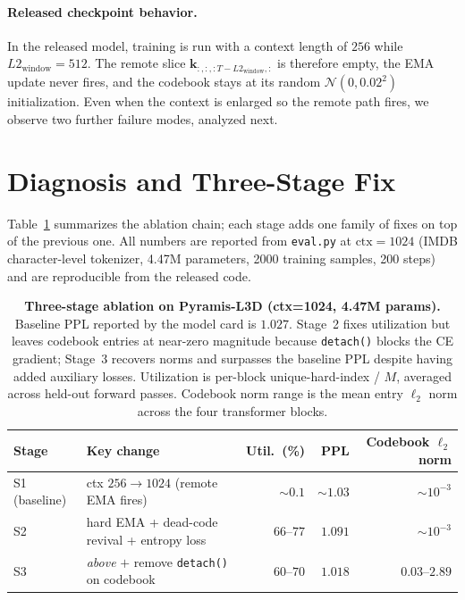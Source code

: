\documentclass[11pt,a4paper]{article}
\begin{document}
\paragraph{Released checkpoint behavior.} In the released model, training is run with a
context length of $256$ while $L2_{\text{window}}=512$. The remote slice
$\bm{k}_{:,:,:T-L2_{\text{window}},:}$ is therefore empty, the EMA update never fires, and
the codebook stays at its random $\mathcal{N}(0, 0.02^2)$ initialization. Even when the
context is enlarged so the remote path fires, we observe two further failure modes, analyzed
next.

\section{Diagnosis and Three-Stage Fix}

Table~\ref{tab:three-stage} summarizes the ablation chain; each stage adds one family of
fixes on top of the previous one. All numbers are reported from \texttt{eval.py} at
$\text{ctx}=1024$ (IMDB character-level tokenizer, 4.47M parameters, 2000 training samples,
200 steps) and are reproducible from the released code.

\begin{table}[!htbp]
\centering
\footnotesize
\setlength{\tabcolsep}{4pt}
\begin{tabularx}{\linewidth}{@{}l >{\raggedright\arraybackslash}X r r r@{}}
\toprule
Stage & Key change & Util.\ (\%) & PPL & Codebook $\ell_2$ norm \\
\midrule
S1 (baseline) & ctx $256 \to 1024$ (remote EMA fires)              & $\sim 0.1$  & $\sim 1.03$   & $\sim 10^{-3}$ \\
S2             & hard EMA + dead-code revival + entropy loss       & $66$--$77$  & $1.091$       & $\sim 10^{-3}$ \\
S3             & \textit{above} $+$ remove \texttt{detach()} on codebook & $60$--$70$  & $\mathbf{1.018}$ & $0.03$--$2.89$ \\
\bottomrule
\end{tabularx}
\caption{\textbf{Three-stage ablation on Pyramis-L3D (ctx=1024, 4.47M params).} Baseline PPL
reported by the model card is $1.027$. Stage~2 fixes utilization but leaves codebook
entries at near-zero magnitude because \texttt{detach()} blocks the CE gradient; Stage~3
recovers norms and surpasses the baseline PPL despite having added auxiliary losses.
Utilization is per-block unique-hard-index / $M$, averaged across held-out forward passes.
Codebook norm range is the mean entry $\ell_2$ norm across the four transformer blocks.}
\label{tab:three-stage}
\end{table}
\end{document}
